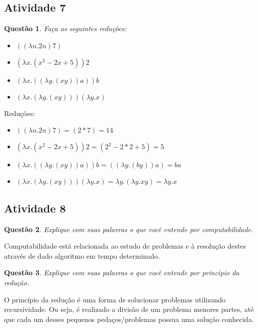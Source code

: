 \documentclass{article}
\newtheorem{problem}{Questão}
\begin{document}
\subsection{Atividade 7}
\begin{problem} Faça as seguintes reduções:
     \begin{itemize}
         \item $((\lambda n.2n) 7)$
         \item $(\lambda x.(x^2 - 2x+5)) 2$
         \item $(\lambda x.((\lambda y.(xy)) a)) b$
         \item $(\lambda x.(\lambda y.(xy))) (\lambda y.x)$
     \end{itemize}
\end{problem}
\begin{solution} Reduções:
    \begin{itemize}
         \item $((\lambda n.2n) 7) = (2*7) = 14$
         \item $(\lambda x.(x^2 - 2x+5)) 2 = (2^2 - 2*2 +5) = 5$
         \item $(\lambda x.((\lambda y.(xy)) a)) b = ((\lambda y.(by)) a) = ba$
         \item $(\lambda x.(\lambda y.(xy))) (\lambda y.x) = \lambda y. (\lambda y. x y) = \lambda y. x$
     \end{itemize}
\end{solution}

\subsection{Atividade 8}
\begin{problem} Explique com suas palavras o que você entende por computabilidade.
\end{problem}

\begin{solution}
Computabilidade está relacionada ao estudo de problemas e à resolução destes através de dado algoritmo em tempo determinado.
\end{solution}

\begin{problem} Explique com suas palavras o que você entende por princípio da redução.
\end{problem}

\begin{solution}
O princípio da redução é uma forma de solucionar problemas utilizando recursividade. Ou seja, é realizado a divisão de um problema menores partes, até que cada um desses pequenos pedaços/problemas possua uma solução conhecida.
\end{solution}
\end{document}

